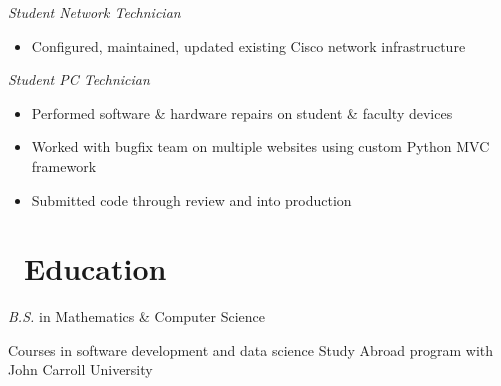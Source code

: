 \documentclass{resume}
\begin{document}
\textit{Student Network Technician}
\begin{itemize}
  \item Configured, maintained, updated existing Cisco network infrastructure
\end{itemize}
\textit{Student PC Technician}
\begin{itemize}
  \item Performed software \& hardware repairs on student \& faculty devices
\end{itemize}

\begin{itemize}
  \item Worked with bugfix team on multiple websites using custom Python MVC framework
  \item Submitted code through review and into production
\end{itemize}

\section{\faGraduationCap\ Education}
\textit{B.S.} in Mathematics \& Computer Science
\par Courses in software development and data science
Study Abroad program with John Carroll University
\end{document}
